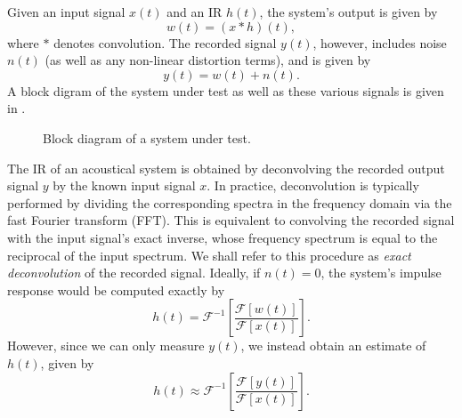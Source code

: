 Given an input signal $x(t)$ and an IR $h(t)$, the system's output is given by
\begin{equation}
w(t) = (x \ast h) (t),
\end{equation}
where $\ast$ denotes convolution.
The recorded signal $y(t)$, however, includes noise $n(t)$ (as well as any non-linear distortion terms), and is given by
\begin{equation}
y(t) = w(t) + n(t).
\end{equation}
A block digram of the system under test as well as these various signals is given in .

\begin{figure}[t]
\centering

\caption{Block diagram of a system under test.}
\label{fig:A5_Impulse_Response:Procedure:Block_Diagram}
\end{figure}

The IR of an acoustical system is obtained by deconvolving the recorded output signal $y$ by the known input signal $x$.
In practice, deconvolution is typically performed by dividing the corresponding spectra in the frequency domain via the fast Fourier transform (FFT).
This is equivalent to convolving the recorded signal with the input signal's exact inverse, whose frequency spectrum is equal to the reciprocal of the input spectrum.
We shall refer to this procedure as \textit{exact deconvolution} of the recorded signal.
Ideally, if $n(t) = 0$, the system's impulse response would be computed exactly by
\begin{equation}
h(t) = \mathcal{F}^{-1} \left[ \frac{\mathcal{F} \left[ w(t) \right]}{\mathcal{F} \left[ x(t) \right]} \right].
\end{equation}
However, since we can only measure $y(t)$, we instead obtain an estimate of $h(t)$, given by
\begin{equation}
h(t) \approx \mathcal{F}^{-1} \left[ \frac{\mathcal{F} \left[ y(t) \right]}{\mathcal{F} \left[ x(t) \right]} \right].
\end{equation}

